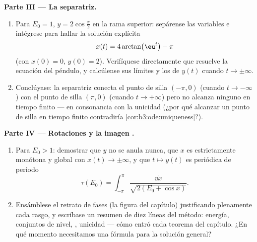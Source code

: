 \begin{problem}
\medskip
\noindent\textbf{Parte III --- La separatriz.}
\begin{enumerate}[resume]
  \item Para $E_0 = 1$, $y = 2\cos\frac x2$ en la rama superior:
  sepárense las variables e intégrese para hallar la solución explícita
        \[
        x(t) = 4\arctan\bigl(\eu^{t}\bigr) - \pi
        \]
        (con $x(0) = 0$, $y(0) = 2$). Verifíquese directamente que
        resuelve la ecuación del péndulo, y calcúlense sus límites y los
        de $y(t)$ cuando $t \to
        \pm\infty$. \item Conclúyase: la
         separatriz conecta el
        punto de silla $(-\pi, 0)$ (cuando $t \to -\infty$) con el punto
        de silla $(\pi, 0)$ (cuando $t \to +\infty$) pero no alcanza
        ninguno en tiempo finito --- en consonancia con la unicidad
        (¿por qué alcanzar un punto de silla en tiempo finito
        contradiría
        \cref{cor:b3:ode:uniqueness}?).
\end{enumerate}

\medskip
\noindent\textbf{Parte IV --- Rotaciones y la imagen .}
\begin{enumerate}[resume]
  \item Para $E_0 > 1$: demostrar que $y$ no se anula nunca, que $x$ es
  estrictamente monótona y global con $x(t) \to
        \pm\infty$, y que $t \mapsto y(t)$ es periódica de periodo
        \[
        \tau(E_0) = \int_{-\pi}^{\pi}
        \frac{\dd x}{\sqrt{2(E_0 + \cos x)}} .
        \]
  \item Ensámblese el retrato de fases
   (la figura del capítulo)
  justificando plenamente cada rasgo, y escríbase un resumen de diez
  líneas del método: energía, conjuntos de nivel, , unicidad
  --- cómo entró cada teorema del capítulo. ¿En qué momento necesitamos
  una fórmula para la solución general?
\end{enumerate}


\end{problem}
